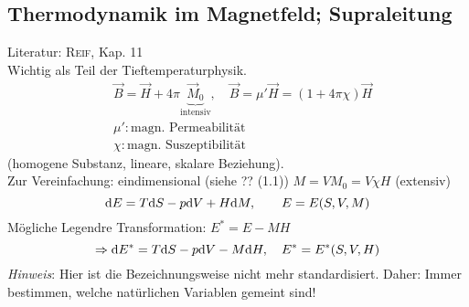 \subsection{Thermodynamik im Magnetfeld; Supraleitung}
Literatur: \textsc{Reif}, Kap. 11\\
Wichtig als Teil der Tieftemperaturphysik.
\begin{equation}
    \begin{split}
        & \vec{B} = \vec{H} + 4 \pi \underbrace{\vec{M}_0}_{\text{intensiv}}, \quad \vec{B} = \mu' \vec{H} = (1 + 4 \pi \chi) \vec{H} \\
        & \mu': \text{magn. Permeabilität} \\
        & \chi: \text{magn. Suszeptibilität}
    \end{split}
\end{equation}
(homogene Substanz, lineare, skalare Beziehung). \\
Zur Vereinfachung: eindimensional (siehe ?? (1.1)) $M = V M_0 = V \chi H$ (extensiv)
\begin{equation}
    \mathrm{d} E = T \mathrm{d} S - p \mathrm{d} V + H \mathrm{d} M, \qquad E = E(S, V, M)
\end{equation}
Mögliche Legendre Transformation: $E^* = E - M H$
\begin{equation}
    \Rightarrow \mathrm{d} E^* = T \mathrm{d} S - p \mathrm{d} V - M \mathrm{d} H, \quad E^* =  E^*(S, V, H)
\end{equation}
\emph{Hinweis}: Hier ist die Bezeichnungsweise nicht mehr standardisiert. Daher: Immer bestimmen, welche natürlichen Variablen gemeint sind!
